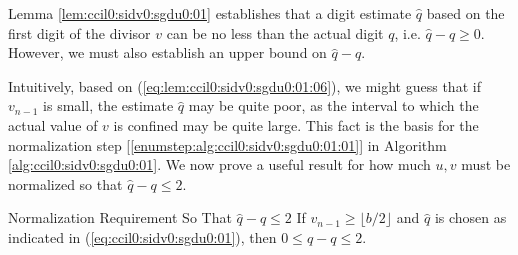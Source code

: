 Lemma \ref{lem:ccil0:sidv0:sgdu0:01} establishes that 
a digit estimate $\hat{q}$ based on the first digit of the
divisor $v$ can be no less than the actual digit $q$, i.e.
$\hat{q}-q \geq 0$.  However, we must also establish an upper bound
on $\hat{q}-q$.

Intuitively, based on
(\ref{eq:lem:ccil0:sidv0:sgdu0:01:06}), we might guess that
if $v_{n-1}$ is small, the estimate $\hat{q}$ may be quite
poor, as the interval to which the actual value of $v$ is confined
may be quite large.  This fact is the basis for the normalization
step [\ref{enumstep:alg:ccil0:sidv0:sgdu0:01:01}] in Algorithm
\ref{alg:ccil0:sidv0:sgdu0:01}.  We now prove a useful result
for how much $u, v$ must be normalized so that $\hat{q}-q \leq 2$.

\begin{vworklemmastatementpar}{Normalization Requirement So That 
                               \mbox{\boldmath$\hat{q} - q \leq 2$}}
\label{lem:ccil0:sidv0:sgdu0:02}
If $v_{n-1} \geq \lfloor b/2 \rfloor$ and $\hat{q}$ is chosen as
indicated in (\ref{eq:ccil0:sidv0:sgdu0:01}), then 
$0 \leq \hat{q} - q \leq 2$.
\end{vworklemmastatementpar}
